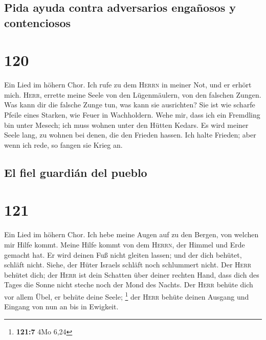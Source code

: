 \hypertarget{pida-ayuda-contra-adversarios-engauxf1osos-y-contenciosos}{%
\subsection{Pida ayuda contra adversarios engañosos y
contenciosos}\label{pida-ayuda-contra-adversarios-engauxf1osos-y-contenciosos}}

\hypertarget{section-119}{%
\section{120}\label{section-119}}

 Ein Lied im höhern Chor. Ich rufe zu dem \textsc{Herrn}
in meiner Not, und er erhört mich.  \textsc{Herr}, errette
meine Seele von den Lügenmäulern, von den falschen Zungen.
 Was kann dir die falsche Zunge tun, was kann sie
ausrichten?  Sie ist wie scharfe Pfeile eines Starken, wie
Feuer in Wachholdern.  Wehe mir, dass ich ein Fremdling
bin unter Mesech; ich muss wohnen unter den Hütten Kedars.
 Es wird meiner Seele lang, zu wohnen bei denen, die den
Frieden hassen.  Ich halte Frieden; aber wenn ich rede, so
fangen sie Krieg an.

\hypertarget{el-fiel-guardiuxe1n-del-pueblo}{%
\subsection{El fiel guardián del
pueblo}\label{el-fiel-guardiuxe1n-del-pueblo}}

\hypertarget{section-120}{%
\section{121}\label{section-120}}

 Ein Lied im höhern Chor. Ich hebe meine Augen auf zu den
Bergen, von welchen mir Hilfe kommt.  Meine Hilfe kommt
von dem \textsc{Herrn}, der Himmel und Erde gemacht hat. 
Er wird deinen Fuß nicht gleiten lassen; und der dich behütet, schläft
nicht.  Siehe, der Hüter Israels schläft noch schlummert
nicht.  Der \textsc{Herr} behütet dich; der \textsc{Herr}
ist dein Schatten über deiner rechten Hand,  dass dich des
Tages die Sonne nicht steche noch der Mond des Nachts. 
Der \textsc{Herr} behüte dich vor allem Übel, er behüte deine Seele;
\footnote{\textbf{121:7} 4Mo 6,24}  der \textsc{Herr}
behüte deinen Ausgang und Eingang von nun an bis in Ewigkeit.

